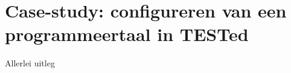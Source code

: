 \chapter{Case-study: configureren van een programmeertaal in TESTed}\label{ch:nieuwe-taal}

Allerlei uitleg
